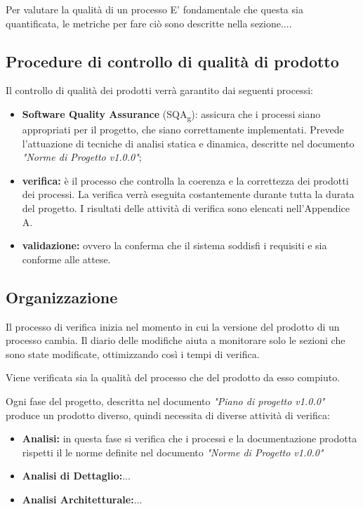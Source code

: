 \documentclass[12pt,a4paper,titlepage]{article}
\begin{document}
	Per valutare la qualità di un processo E' fondamentale che questa sia quantificata, le metriche per fare ciò sono descritte nella sezione....
	
	\subsection{Procedure di controllo di qualità di prodotto}
	Il controllo di qualità dei prodotti verrà garantito dai seguenti processi:
	\begin{itemize}
		\item \textbf{Software Quality Assurance} (SQA\textsubscript{g}): assicura che i processi siano appropriati per il progetto, che siano correttamente implementati. Prevede l'attuazione di tecniche di analisi statica e dinamica, descritte nel documento \textit{"Norme di Progetto v1.0.0"};
		\item \textbf{verifica:} è il processo che controlla la coerenza e la correttezza dei prodotti dei processi. La verifica verrà eseguita costantemente durante tutta la durata del progetto. I risultati delle attività di verifica sono elencati nell'Appendice A.
		\item \textbf{validazione:} ovvero la conferma che il sistema soddisfi i requisiti e sia conforme alle attese.
	\end{itemize}

	\subsection{Organizzazione}
	Il processo di verifica inizia nel momento in cui la versione del prodotto di un processo cambia. Il diario delle modifiche aiuta a monitorare solo le sezioni che sono state modificate, ottimizzando così i tempi di verifica. 
	
	Viene verificata sia la qualità del processo che del prodotto da esso compiuto.
	
	Ogni fase del progetto, descritta nel documento \textit{"Piano di progetto v1.0.0"} produce un prodotto diverso, quindi necessita di diverse attività di verifica:
	\begin{itemize}
		\item \textbf{Analisi:} in questa fase si verifica che i processi e la documentazione prodotta rispetti il le norme definite nel documento \textit{"Norme di Progetto v1.0.0"}
		\item \textbf{Analisi di Dettaglio:}...
		\item \textbf{Analisi Architetturale:}...
	\end{itemize}
\end{document}
